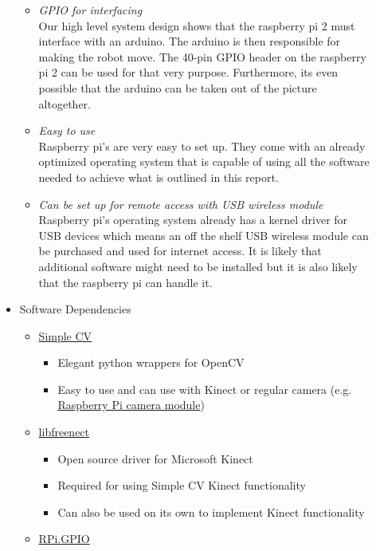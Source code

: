 \documentclass[12pt]{article}
\begin{document}
\begin{description}
\begin{itemize}
\begin{itemize}
					\item \textit{GPIO for interfacing} \\
						Our high level system design shows that the raspberry pi 2 must interface with an arduino. The arduino is then responsible for making the robot move.
						The 40-pin GPIO header on the raspberry pi 2 can be used for that very purpose. Furthermore, its even possible that the arduino can be taken out of the picture altogether.
					\item \textit{Easy to use} \\
						Raspberry pi's are very easy to set up. They come with an already optimized operating system that is capable of using all the software needed to achieve what is outlined in this report.
					\item \textit{Can be set up for remote access with USB wireless module} \\
						Raspberry pi's operating system already has a kernel driver for USB devices which means an off the shelf USB wireless module can be purchased and used for internet access.
						It is likely that additional software might need to be installed but it is also likely that the raspberry pi can handle it.
				\end{itemize}
			\item Software Dependencies
				\begin{itemize}
					\item \href{https://github.com/sightmachine/SimpleCV/tree/develop}{Simple CV}
						\begin{itemize}
							\item Elegant python wrappers for OpenCV
							\item Easy to use and can use with Kinect or regular camera (e.g. \href{https://www.raspberrypi.org/products/camera-module/}{Raspberry Pi camera module})
						\end{itemize}
					\item \href{https://github.com/OpenKinect/libfreenect}{libfreenect}
						\begin{itemize}
							\item Open source driver for Microsoft Kinect
							\item Required for using Simple CV Kinect functionality
							\item Can also be used on its own to implement Kinect functionality
						\end{itemize}
					\item \href{http://sourceforge.net/p/raspberry-gpio-python/wiki/install/}{RPi.GPIO}

\end{itemize}
\end{itemize}
\end{description}
\end{document}
